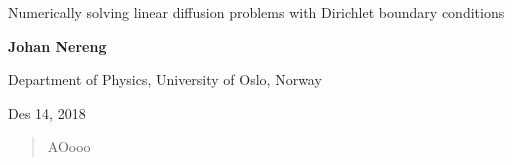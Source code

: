 \documentclass[%
oneside,                 %
final,                   %
10pt]{article}
\begin{document}

\newcommand{\exercisesection}[1]{\subsection*{#1}}






\thispagestyle{empty}

\begin{center}
{\LARGE\bf
\begin{spacing}{1.25}
Numerically solving linear diffusion problems with Dirichlet boundary conditions
\end{spacing}
}
\end{center}


\begin{center}
{\bf Johan Nereng}
\end{center}

    \begin{center}
\centerline{{\small Department of Physics, University of Oslo, Norway}}
\end{center}
    

\begin{center}
Des 14, 2018
\end{center}

\vspace{1cm}
\begin{abstract}
AOooo
\end{abstract}
\end{document}
